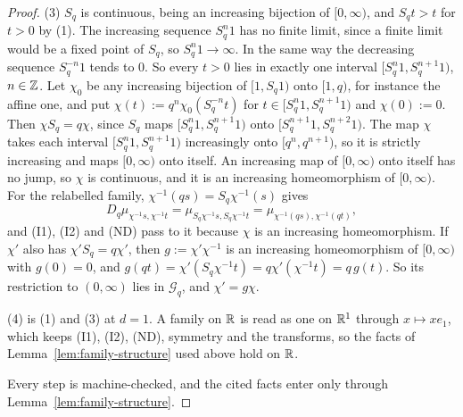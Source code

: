 \begin{proof}
(3) $S_q$ is continuous, being an increasing bijection of $[0,\infty)$, and $S_qt > t$ for $t > 0$
by (1). The increasing sequence $S_q^n1$ has no
finite limit, since a finite limit would be a fixed point of $S_q$, so $S_q^n1 \to \infty$. In the
same way the decreasing sequence $S_q^{-n}1$ tends to $0$. So every $t > 0$ lies in exactly one
interval $[S_q^n1, S_q^{n+1}1)$, $n \in \mathbb{Z}$. Let $\chi_0$ be any increasing bijection of
$[1, S_q1)$ onto $[1, q)$, for instance the affine one, and put $\chi(t) := q^n\chi_0(S_q^{-n}t)$ for
$t \in [S_q^n1, S_q^{n+1}1)$ and $\chi(0) := 0$. Then $\chi S_q = q\chi$, since $S_q$ maps
$[S_q^n1, S_q^{n+1}1)$ onto $[S_q^{n+1}1, S_q^{n+2}1)$. The map $\chi$ takes each interval
$[S_q^n1, S_q^{n+1}1)$ increasingly onto $[q^n, q^{n+1})$, so it is strictly increasing and maps
$[0,\infty)$ onto itself. An increasing map of $[0,\infty)$ onto itself has no jump, so $\chi$ is
continuous, and it is an increasing homeomorphism of $[0,\infty)$. For the relabelled family, $\chi^{-1}(qs) = S_q\chi^{-1}(s)$ gives
\[
  D_q\mu_{\chi^{-1}s, \chi^{-1}t} = \mu_{S_q\chi^{-1}s, S_q\chi^{-1}t} = \mu_{\chi^{-1}(qs), \chi^{-1}(qt)},
\]
and (I1), (I2) and (ND) pass to it because $\chi$ is an increasing homeomorphism. If $\chi'$ also has
$\chi'S_q = q\chi'$, then $g := \chi'\chi^{-1}$ is an increasing homeomorphism of $[0,\infty)$
with $g(0) = 0$, and $g(qt) = \chi'(S_q\chi^{-1}t) = q\chi'(\chi^{-1}t) = q\,g(t)$. So its
restriction to $(0,\infty)$ lies in $\mathcal{G}_q$, and $\chi' = g\chi$.

(4) is (1) and (3) at $d = 1$. A family on $\mathbb{R}$ is read as one on $\mathbb{R}^1$ through $x \mapsto xe_1$,
which keeps (I1), (I2), (ND), symmetry and the transforms, so the facts of
Lemma~\ref{lem:family-structure} used above hold on $\mathbb{R}$.

Every step is machine-checked, and the cited facts enter only through
Lemma~\ref{lem:family-structure}.
\end{proof}

